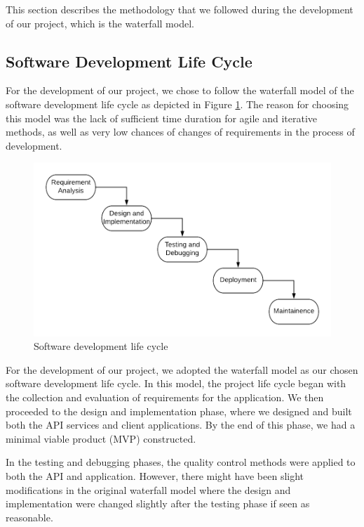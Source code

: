 This section describes the methodology that we followed during the development of our project, which is the waterfall model.

\subsection{Software Development Life Cycle}
For the development of our project, we chose to follow the waterfall model\cite{waterfall} of the software development life cycle as depicted in Figure \ref{fig:sdlc}. The reason for choosing this model was the lack of sufficient time duration for agile and iterative methods, as well as very low chances of changes of requirements in the process of development. 

\begin{figure}[h]
	\includegraphics[width=\linewidth]{figures/sdlc.png}
	\centering
	\caption{ Software development life cycle}
	\label{fig:sdlc}
\end{figure}

For the development of our project, we adopted the waterfall model as our chosen software development life cycle. In this model, the project life cycle began with the collection and evaluation of requirements for the application. We then proceeded to the design and implementation phase, where we designed and built both the API services and client applications. By the end of this phase, we had a minimal viable product (MVP) constructed.

In the testing and debugging phases, the quality control methods were applied to both the API and application. However, there might have been slight modifications in the original waterfall model where the design and implementation were changed slightly after the testing phase if seen as reasonable.

